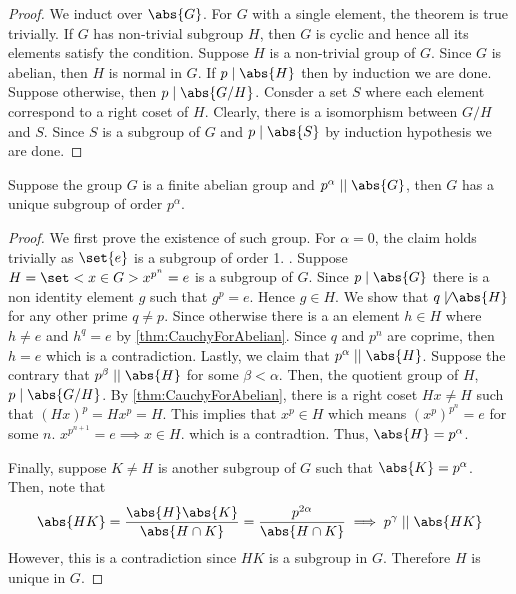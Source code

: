 \begin{proof}
    We induct over \(\abs{G}\). For \(G\) with a single element, the theorem is true trivially. If \(G\) has non-trivial subgroup \(H\), then \(G\) is cyclic and hence all its elements satisfy the condition. Suppose \(H\) is a non-trivial group of \(G\). Since \(G\) is abelian, then \(H\) is normal in \(G\). If \(p \mid \abs{H}\) then by induction we are done. Suppose otherwise, then \(p \mid \abs{G/H}\). Consder a set \(S\) where each element correspond to a right coset of \(H\). Clearly, there is a isomorphism between \(G/H\) and \(S\). Since \(S\) is a subgroup of \(G\) and \(p \mid \abs{S}\) by induction hypothesis we are done.
\end{proof}

\begin{theorem}
    Suppose the group \(G\) is a finite abelian group and \(p^{\alpha} \mid\mid \abs{G}\), then \(G\) has a unique subgroup of order \(p^{\alpha}\).
\end{theorem}

\begin{proof}
    We first prove the existence of such group. For \(\alpha = 0\), the claim holds trivially as \(\set{e}\) is a subgroup of order 1. . Suppose \(H = \set<x \in G>{x^{p^n} = e}\) is a subgroup of \(G\). Since \(p \mid \abs{G}\) there is a non identity element \(g\) such that \(g^p = e\). Hence \(g \in H\). We show that \(q \not \mid \abs{H}\) for any other prime \(q \neq p\). Since otherwise there is a an element \(h \in H\) where \(h \neq e \) and \(h^q = e\) by \ref{thm:CauchyForAbelian}. Since \(q\) and \(p^n\) are coprime, then \(h = e\) which is a contradiction. Lastly, we claim that \(p^{\alpha} \mid\mid \abs{H}\). Suppose the contrary that \(p^{\beta} \mid\mid \abs{H}\) for some \(\beta < \alpha\). Then, the quotient group of \(H\), \(p \mid \abs{G/H}\). By \ref{thm:CauchyForAbelian}, there is a right coset \(Hx \neq H\) such that \((Hx)^p = Hx^p = H\). This implies that \(x^p \in H\) which means \((x^p)^{p^n} = e\) for some \(n\). \(x^{p^{n+1}} = e \implies x \in H\). which is a contradtion. Thus, \(\abs{H} = p^{\alpha}\).

    Finally, suppose \(K \neq H\) is another subgroup of \(G\) such that \(\abs{K} = p^{\alpha}\). Then, note that 
    \begin{equation*}
        \abs{HK} = \dfrac{\abs{H} \abs{K}}{\abs{H \cap K}} = \dfrac{p^{2\alpha}}{\abs{H \cap K}} \implies p^{\gamma} \mid\mid \abs{HK}
    \end{equation*}
    However, this is a contradiction since  \(HK\) is a subgroup in \(G\). Therefore \(H\) is unique in \(G\).
\end{proof}

